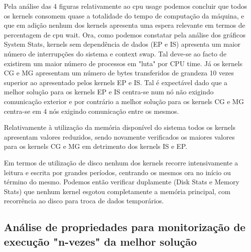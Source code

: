 \documentclass[conference,compsoc]{IEEEtran}
\begin{document}
Pela análise das 4 figuras relativamente ao cpu usage podemos concluir que todos os kernels consomem quase a totalidade do tempo de computação da máquina, e que em adição nenhum dos kernels apresenta uma espera relevante em termos de percentagem de cpu wait. Ora, como podemos constatar pela análise dos gráficos System Stats, kernels sem dependência de dados (EP e IS) apresenta um maior número de interrupções do sistema e context swap. Tal deve-se ao facto de existirem um maior número de processos em "luta" por CPU time. Já os kernels CG e MG apresentam um número de bytes transferidos de grandeza 10 vezes superior ao apresentado pelos kernels EP e IS. Tal é expectável dado que a  melhor solução para os kernels EP e IS centra-se num nó não exigindo comunicação exterior e por contrário a melhor solução para os kernels CG e MG centra-se em 4 nós exigindo comunicação entre os mesmos.\par 
Relativamente à utilização da memória disponível do sistema todos os kernels apresentam valores reduzidos, sendo novamente verificados os maiores valores para os kernels CG e MG em detrimento dos kernels IS e EP. \par 
Em termos de utilização de disco nenhum dos kernels recorre intensivamente a leitura e escrita por grandes períodos, centrando os mesmos ora no início ou término do mesmo. Podemos então verificar duplamente (Disk Stats e Memory Stats) que nenhum kernel esgotou completamente a memória principal, com recorrência ao disco para troca de dados temporários.

\subsection{Análise de propriedades para monitorização de execução "n-vezes" da melhor solução}
\end{document}
